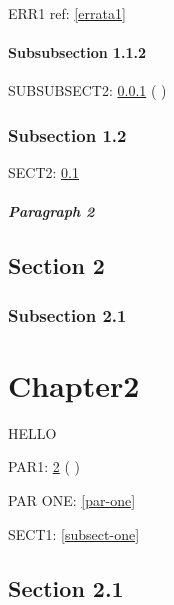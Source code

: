\documentclass[a4paper,12pt]{report}
\makeatletter
\newcommand{\getCurrentSectionNumber}{%
  \ifnum\c@section=0 %
  \thechapter
  \else
  \ifnum\c@subsection=0 %
  \thesection
  \else
  \ifnum\c@subsubsection=0 %
  \thesubsection
  \else
  \thesubsubsection
  \fi
  \fi
  \fi
}
\makeatother
\begin{document}

ERR1 ref: \ref{errata1}




\subsubsection{Subsubsection 1.1.2}\label{subsubsect-two}


SUBSUBSECT2: \cref{subsubsect-two} (\getCurrentSectionNumber)


\subsection{Subsection 1.2}\label{subsect-two}

SECT2: \cref{subsect-two}




\paragraph*{Paragraph 2}\label{par-two}




\section{Section 2}\label{sect-two}

\subsection{Subsection 2.1}\label{subsect-two-one}

\chapter{Chapter2}\label{chap-two}


HELLO 

PAR1: \cref{chap-two}  (\getCurrentSectionNumber)


PAR ONE: \cref{par-one}

SECT1: \cref{subsect-one}


\section{Section 2.1}\label{sect-two-one}
\end{document}
